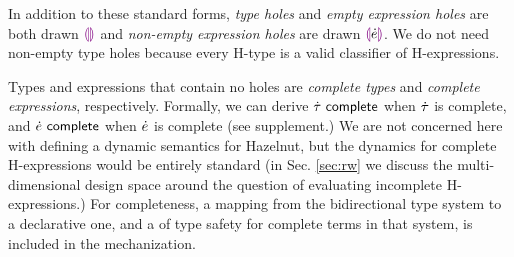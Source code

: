 In addition to these standard forms, \emph{type holes} and \emph{empty
  expression holes} are both drawn $\textcolor{violet}{\llparenthesis}\textcolor{violet}{\rrparenthesis}$ and \emph{non-empty expression
  holes} are drawn $\textcolor{violet}{\llparenthesis}\dot{e}\textcolor{violet}{\rrparenthesis}$. We do not need non-empty type holes
because every H-type is a valid classifier of H-expressions.

Types and expressions that contain no holes are \emph{complete types} and
\emph{complete expressions}, respectively. Formally, we can derive
$\dot{\tau}~\mathsf{complete}$ when $\dot{\tau}$ is complete, and $\dot{e}~\mathsf{complete}$ when
$\dot{e}$ is complete (see supplement.) We are not concerned here with
defining a dynamic semantics for Hazelnut, but the dynamics for complete
H-expressions would be entirely standard (in Sec. \ref{sec:rw} we discuss
the multi-dimensional design space around the question of evaluating
incomplete H-expressions.) For completeness, a mapping from the
bidirectional type system to a declarative one, and a of type safety for
complete terms in that system, is included in the mechanization.

